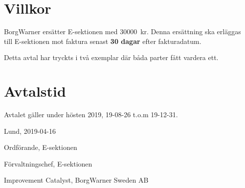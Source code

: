 \documentclass[10pt]{article}
\def\date{2019-04-16} %
\begin{document}
        \section{Villkor}
        BorgWarner ersätter E-sektionen med \SI{30000}{kr}. Denna ersättning ska erläggas till E-sektionen mot faktura senast \textbf{30 dagar} efter fakturadatum.
        \newline

        Detta avtal har tryckts i två exemplar där båda parter fått vardera ett.
        
        \section{Avtalstid}
        Avtalet gäller under hösten 2019, 19-08-26 t.o.m 19-12-31.

        \begin{signatures}{3}
            Lund, \date
            \signature{Edvard Carlsson}{Ordförande, E-sektionen}
            \signature{Henrik Ramström}{Förvaltningschef, E-sektionen}
            \signature{Petter Johansson}{Improvement Catalyst, BorgWarner Sweden AB}
        \end{signatures}
    
\end{document}
